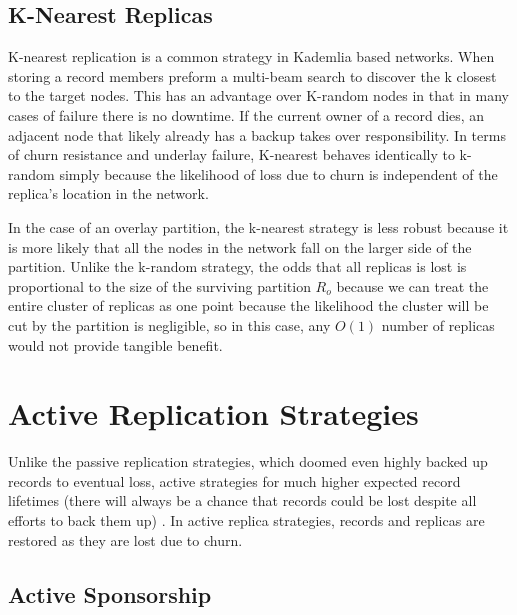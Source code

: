 \documentclass[conference]{IEEEtran}
\begin{document}
\subsection{K-Nearest Replicas}
K-nearest replication is a common strategy in Kademlia based networks.
When storing a record members preform a multi-beam search to discover the k closest to the target nodes.
This has an advantage over K-random nodes in that in many cases of failure there is no downtime.
If the current owner of a record dies, an adjacent node that likely already has a backup takes over responsibility.
In terms of churn resistance and underlay failure, K-nearest behaves identically to k-random simply because the likelihood of loss due to churn is independent of the replica's location in the network.

In the case of an overlay partition, the k-nearest strategy is less robust because it is more likely that all the nodes in the network fall on the larger side of the partition.
Unlike the k-random strategy, the odds that all replicas is lost is proportional to the size of the surviving partition $R_{o}$ because we can treat the entire cluster of replicas as one point because the likelihood the cluster will be cut by the partition is negligible, so in this case, any $O(1)$ number of replicas would not provide tangible benefit.

  


\section{Active Replication Strategies}

Unlike the passive replication strategies, which doomed even highly backed up records to eventual loss, active strategies for much higher expected record lifetimes (there will always be a chance that records could be lost despite all efforts to back them up) .
In active replica strategies, records and replicas are restored as they are lost due to churn.


\subsection{Active Sponsorship}
\end{document}

